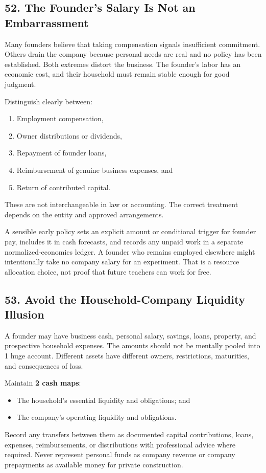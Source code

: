 \subsection*{52. The Founder's Salary Is Not an Embarrassment}

Many founders believe that taking compensation signals insufficient commitment. Others drain the company because personal needs are real and no policy has been established. Both extremes distort the business. The founder's labor has an economic cost, and their household must remain stable enough for good judgment.

Distinguish clearly between:
\begin{enumerate}
\item Employment compensation,
\item Owner distributions or dividends,
\item Repayment of founder loans,
\item Reimbursement of genuine business expenses, and
\item Return of contributed capital.
\end{enumerate}
These are not interchangeable in law or accounting. The correct treatment depends on the entity and approved arrangements.

A sensible early policy sets an explicit amount or conditional trigger for founder pay, includes it in cash forecasts, and records any unpaid work in a separate normalized-economics ledger. A founder who remains employed elsewhere might intentionally take no company salary for an experiment. That is a resource allocation choice, not proof that future teachers can work for free.

\subsection*{53. Avoid the Household-Company Liquidity Illusion}

A founder may have business cash, personal salary, savings, loans, property, and prospective household expenses. The amounts should not be mentally pooled into 1 huge account. Different assets have different owners, restrictions, maturities, and consequences of loss.

Maintain \textbf{2 cash maps}:
\begin{itemize}
\item The household's essential liquidity and obligations; and
\item The company's operating liquidity and obligations.
\end{itemize}
Record any transfers between them as documented capital contributions, loans, expenses, reimbursements, or distributions with professional advice where required. Never represent personal funds as company revenue or company prepayments as available money for private construction.

